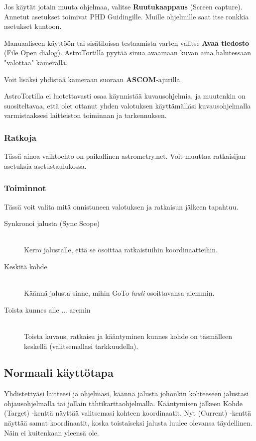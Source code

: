 \documentclass{article}
\begin{document}
Jos käytät jotain muuta ohjelmaa, valitse \textbf{Ruutukaappaus} (Screen capture). Annetut asetukset toimivat PHD Guidingille. 
Muille ohjelmille saat itse ronkkia asetukset kuntoon.

Manuaaliseen käyttöön tai sisätiloissa testaamista varten valitse \textbf{Avaa tiedosto} (File Open dialog). AstroTortilla pyytää sinua avaamaan kuvan aina halutessaan "valottaa" kameralla.

Voit lisäksi yhdistää kameraan suoraan \textbf{ASCOM}-ajurilla.

AstroTortilla ei luotettavasti osaa käynnistää kuvausohjelmia, ja muutenkin on suositeltavaa, että olet ottanut yhden valotuksen käyttämälläsi kuvausohjelmalla varmistaaksesi laitteiston toiminnan ja tarkennuksen.

\subsubsection{Ratkoja}

Tässä ainoa vaihtoehto on paikallinen astrometry.net. Voit muuttaa ratkaisijan asetuksia asetustaulukossa.

\subsubsection{Toiminnot}

Tässä voit valita mitä onnistuneen valotuksen ja ratkaisun jälkeen tapahtuu.
\begin{description}
\item[Synkronoi jalusta (Sync Scope)] \hfill \\
Kerro jalustalle, että se osoittaa ratkaistuihin koordinaatteihin.
\item[Keskitä kohde] \hfill \\
Käännä jalusta sinne, mihin GoTo \emph{luuli} osoittavansa aiemmin.
\item[Toista kunnes alle ... arcmin ] \hfill \\
Toista kuvaus, ratkaisu ja kääntyminen kunnes kohde on täsmälleen keskellä (valitsemallasi tarkkuudella).
\end{description}

\subsection{Normaali käyttötapa}

Yhdistettyäsi laitteesi ja ohjelmasi, käännä jalusta johonkin kohteeseen 
jalustasi ohjausohjelmalla tai jollain tähtikarttaohjelmalla.
Kääntymisen jälkeen Kohde (Target) -kenttä näyttää valitsemasi kohteen koordinaatit. Nyt (Current) -kenttä näyttää samat koordinaatit,
koska toistaiseksi jalusta luulee olevansa täydellinen. Näin ei kuitenkaan yleensä ole.
\end{document}
